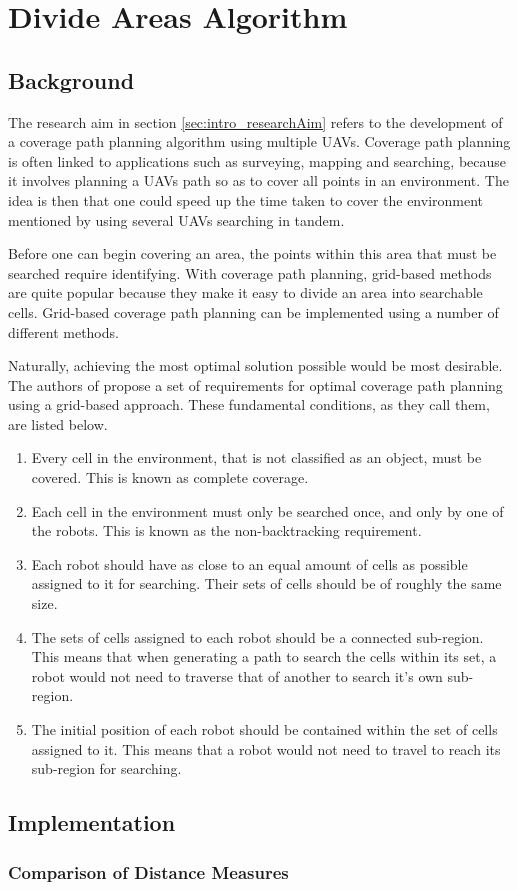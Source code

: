 \chapter{Divide Areas Algorithm}
\label{chp:DARP}

\section{Background}
The research aim in section \ref{sec:intro_researchAim} refers to the development of a coverage path planning algorithm using multiple UAVs. Coverage path planning is often linked to applications such as surveying, mapping and searching, because it involves planning a UAVs path so as to cover all points in an environment. The idea is then that one could speed up the time taken to cover the environment mentioned by using several UAVs searching in tandem.

Before one can begin covering an area, the points within this area that must be searched require identifying. With coverage path planning, grid-based methods are quite popular because they make it easy to divide an area into searchable cells.
Grid-based coverage path planning can be implemented using a number of different methods. 

Naturally, achieving the most optimal solution possible would be most desirable. The authors of \cite{DARP2017} propose a set of requirements for optimal coverage path planning using a grid-based approach. These fundamental conditions, as they call them, are listed below.

\begin{enumerate}
	\item Every cell in the environment, that is not classified as an object, must be covered. This is known as complete coverage.
	\item Each cell in the environment must only be searched once, and only by one of the robots. This is known as the non-backtracking requirement.
	\item Each robot should have as close to an equal amount of cells as possible assigned to it for searching. Their sets of cells should be of roughly the same size.
	\item The sets of cells assigned to each robot should be a connected sub-region. This means that when generating a path to search the cells within its set, a robot would not need to traverse that of another to search it's own sub-region.
	\item The initial position of each robot should be contained within the set of cells assigned to it. This means that a robot would not need to travel to reach its sub-region for searching.
\end{enumerate}

\section{Implementation}
\subsection{Comparison of Distance Measures}
